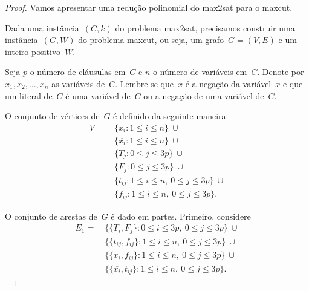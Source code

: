 	\begin{proof}
		Vamos apresentar uma redução polinomial do {\sc max2sat}
		para o {\sc maxcut}.

		Dada uma instância~$(C,k)$ do problema {\sc max2sat}, 
		precisamos construir uma instância~$(G,W)$
		do problema {\sc maxcut}, ou seja, um grafo~${G = (V,E)}$
		e um inteiro positivo~$W$.

		Seja $p$ o número de cláusulas em~$C$ e
			$n$ o número de variáveis em~$C$.
		Denote por~$x_1,x_2,\ldots,x_n$ as variáveis
		de~$C$.
		Lembre-se que~$\overline{x}$ é a negação da variável~$x$
		e que um literal de~$C$ é uma variável de~$C$ ou a 
		negação de uma variável de~$C$.

		O conjunto de vértices de~$G$ é definido da seguinte maneira:
		\begin{align}
			V = \ &\{x_i: 1\le i\le n\} \ \cup \nonumber\\
				&\{\overline{x_i}: 1\le i\le n\} \ \cup\nonumber\\ 
				&\{T_j: 0\le j\le 3p\} \ \cup \nonumber\\
				&\{F_j: 0\le j\le 3p\} \ \cup \nonumber\\
				&\{t_{ij}: 1\le i\le n,\ 0\le j\le 3p\} 
					\ \cup \nonumber\\
				&\{f_{ij}: 1\le i\le n,\ 0\le j\le 3p\}.\nonumber
		\end{align}

		\bigskip 

		O conjunto de arestas de~$G$ é dado em partes. 
		Primeiro, considere
		\begin{align}
			E_1= \ &\{ \{T_i,F_j\}: 0\le i\le 3p,\ 0\le j\le 3p\}\ \cup 
					\nonumber\\
				&\{\{t_{ij}, f_{ij}\}: 1\le i\le n,\ 
					0\le j\le 3p\}\ \cup \nonumber \\
				&\{\{x_i, f_{ij}\}: 1\le i\le n,\ 
					0\le j\le 3p\} \ \cup \nonumber \\
				&\{\{\overline{x_i}, t_{ij}\}: 1\le 
					i\le n,\ 0\le j\le 3p\}. \nonumber
		\end{align}


\end{proof}
